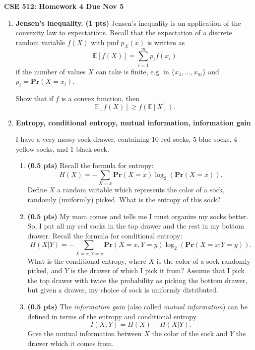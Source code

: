 \documentclass{article}
\newcommand{\mypagebreak}{\begin{center}
		\noindent\makebox[\linewidth]{\rule{7.5in}{1pt}}
	\end{center}}
\newcommand{\bE}{\mathbb E}
\newcommand{\pr}{\mathbf{Pr}}
\newcommand{\showpoints}[1]{\textbf{(#1 pts)}}
\begin{document}
{\Large\textbf{CSE 512: Homework 4 \hfill
Due Nov 5}}


\mypagebreak

\begin{enumerate}


\item \textbf{Jensen's inequality.} \showpoints{1} Jensen's inequality is an application of the convexity law to expectations. 
Recall that the expectation of a discrete random variable $f(X)$  with pmf $p_X(x)$ is written as 
\[
\bE[f(X)] =  \sum_{i=1}^m p_i f(x_i)
\]
if the number of values $X$ can take is finite, e.g. in $\{x_1,...,x_m\}$ and $p_i = \pr(X=x_i)$.

Show that if $f$ is a convex function,
then 
\[
\bE[f(X)] \geq f(\bE[X]).
\]



\item \textbf{Entropy, conditional entropy, mutual information, information gain}

I have a very messy sock drawer, containing 10 red socks, 5 blue socks, 4 yellow socks, and 1 black sock. 
\begin{enumerate}

\item \showpoints{0.5} Recall the formula for entropy:
\[
H(X) = -\sum_{X=x} \pr(X=x)\log_2(\pr(X=x)). 
\]
Define $X$ a random variable which represents the color of a sock, randomly (uniformly) picked.  What is the entropy of this sock?


\item \showpoints{0.5} My mom comes and tells me I must organize my socks better. So, I put all my red socks in the top drawer and the rest in my bottom drawer. Recall the formula for conditional entropy:
\[
H(X|Y) = -\sum_{X=x, Y=y} \pr(X=x,Y=y)\log_2(\pr(X=x|Y=y)). 
\]
What is the conditional entropy, where $X$ is the color of a sock randomly picked, and $Y$ is the drawer of which I pick it from? Assume that I pick the top drawer with twice the probability as picking the bottom drawer, but given a drawer, my choice of sock is uniformly distributed.



\item \showpoints{0.5} The \emph{information gain} (also called \emph{mutual information}) can be defined in terms of the entropy and conditional entropy 
\[
I(X;Y) = H(X) - H(X|Y). 
\]
Give the mutual information between $X$ the color of the sock and $Y$ the drawer which it comes from. 





\end{enumerate}
\end{enumerate}
\end{document}
